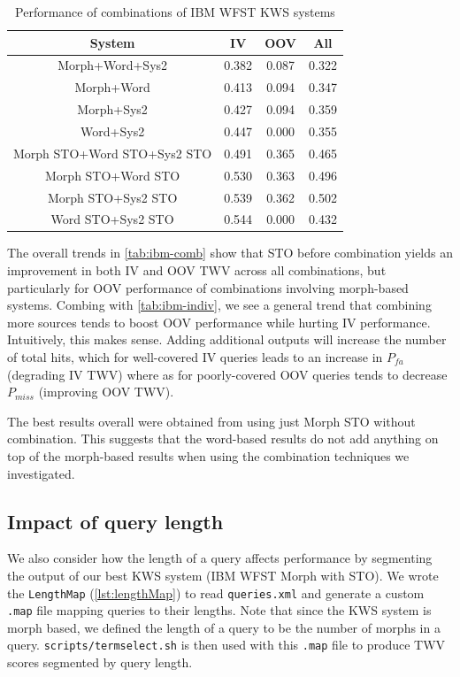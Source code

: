 \documentclass[a4paper,oneside,reqno]{amsart}
\begin{document}
\begin{table}[ht!]
  \begin{tabular}{cccc}
    \toprule
    System                      & IV    & OOV   & All \\
    \midrule
    Morph+Word+Sys2             & 0.382 & 0.087 & 0.322 \\
    Morph+Word                  & 0.413 & 0.094 & 0.347 \\
    Morph+Sys2                  & 0.427 & 0.094 & 0.359 \\
    Word+Sys2                   & 0.447 & 0.000 & 0.355 \\
    \hline
    Morph STO+Word STO+Sys2 STO & 0.491 & 0.365 & 0.465 \\
    Morph STO+Word STO          & 0.530 & 0.363 & 0.496 \\
    Morph STO+Sys2 STO          & 0.539 & 0.362 & 0.502 \\
    Word STO+Sys2 STO           & 0.544 & 0.000 & 0.432 \\
    \bottomrule
  \end{tabular}
  \caption{Performance of combinations of IBM WFST KWS systems}
  \label{tab:ibm-comb}
\end{table}

The overall trends in \autoref{tab:ibm-comb} show that STO before combination
yields an improvement in both IV and OOV TWV across all combinations, but
particularly for OOV performance of combinations involving morph-based systems.
Combing with \autoref{tab:ibm-indiv}, we see a general trend that combining
more sources tends to boost OOV performance while hurting IV performance.
Intuitively, this makes sense. Adding additional outputs will increase the
number of total hits, which for well-covered IV queries leads to an increase in
$P_{fa}$ (degrading IV TWV) where as for poorly-covered OOV queries tends to
decrease $P_{miss}$ (improving OOV TWV).

The best results overall were obtained from using just Morph STO without combination.
This suggests that the word-based results do not add anything on top of the morph-based
results when using the combination techniques we investigated.

\subsection{Impact of query length}

We also consider how the length of a query affects performance by segmenting
the output of our best KWS system (IBM WFST Morph with STO).  We wrote the
\texttt{LengthMap} (\autoref{lst:lengthMap}) to read \texttt{queries.xml} and
generate a custom \texttt{.map} file mapping queries to their lengths. Note
that since the KWS system is morph based, we defined the length of a query to
be the number of morphs in a query. \texttt{scripts/termselect.sh} is then
used with this \texttt{.map} file to produce TWV scores segmented by query length.
\end{document}
